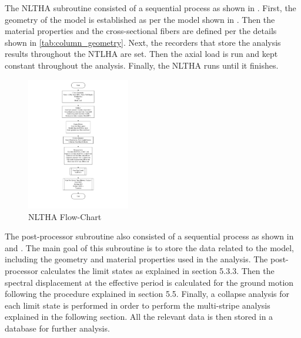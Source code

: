 The NLTHA subroutine consisted of a sequential process as shown in . First, the geometry of the model is established as per the model shown in . Then the material properties and the cross-sectional fibers are defined per the details shown in \ref{tab:column_geometry}. Next, the recorders that store the analysis results throughout the NTLHA are set. Then the axial load is run and kept constant throughout the analysis. Finally, the NLTHA runs until it finishes.

\begin{figure}[htp]
	\centering
	\includegraphics[width=0.40\textwidth]{VAC Thesis 2.0/Chapter-5/figs/NLTHA_FlowCharts_01.pdf}
	\caption{NLTHA Flow-Chart}
	\label{fig:nltha_flowchart}
\end{figure}

The post-processor subroutine also consisted of a sequential process as shown in  and  . The main goal of this subroutine is to store the data related to the model, including the geometry and material properties used in the analysis. The post-processor calculates the limit states as explained in section 5.3.3. Then the spectral displacement at the effective period is calculated for the ground motion following the procedure explained in section 5.5. Finally, a collapse analysis for each limit state is performed in order to perform the multi-stripe analysis explained in the following section. All the relevant data is then stored in a database for further analysis.


